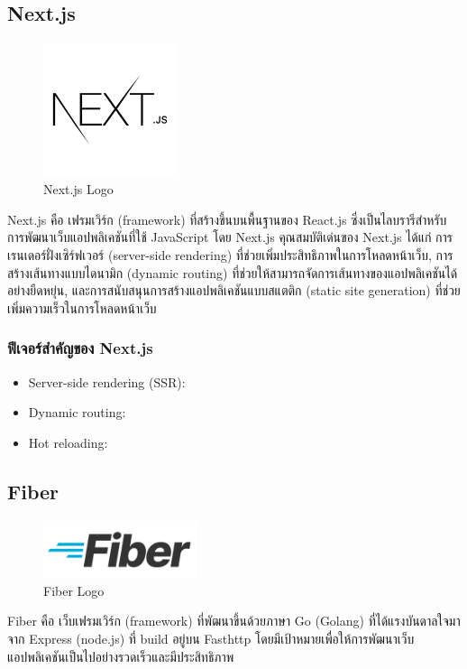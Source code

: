 \subsection{Next.js}
    \begin{figure}[ht]
        \centering
        \includegraphics[width=0.35\textwidth]{image/Tools/nextjs-logo.png}
        \caption[Next.js Logo]{Next.js Logo\footnotemark}
        \label{fig:nextjs_logo}
    \end{figure}
    \FloatBarrier
    \qquad Next.js คือ เฟรมเวิร์ก (framework) ที่สร้างขึ้นบนพื้นฐานของ React.js ซึ่งเป็นไลบรารีสำหรับการพัฒนาเว็บแอปพลิเคชันที่ใช้ JavaScript โดย Next.js คุณสมบัติเด่นของ Next.js ได้แก่ การเรนเดอร์ฝั่งเซิร์ฟเวอร์ (server-side rendering) ที่ช่วยเพิ่มประสิทธิภาพในการโหลดหน้าเว็บ, การสร้างเส้นทางแบบไดนามิก (dynamic routing) ที่ช่วยให้สามารถจัดการเส้นทางของแอปพลิเคชันได้อย่างยืดหยุ่น, และการสนับสนุนการสร้างแอปพลิเคชันแบบสแตติก (static site generation) ที่ช่วยเพิ่มความเร็วในการโหลดหน้าเว็บ
    \subsubsection{ฟีเจอร์สำคัญของ Next.js}
    \begin{itemize}
        \item Server-side rendering (SSR): 
        \item Dynamic routing: 
        \item Hot reloading: 
    \end{itemize}
\subsection{Fiber}
    \begin{figure}[ht]
        \centering
        \includegraphics[width=0.4\textwidth, keepaspectratio]{image/Tools/fiber-logo.png}
        \caption[Fiber Logo]{Fiber Logo\footnotemark}
        \label{fig:fiber_logo}
    \end{figure}
    \FloatBarrier
    \qquad Fiber คือ เว็บเฟรมเวิร์ก (framework) ที่พัฒนาขึ้นด้วยภาษา Go (Golang) ที่ได้แรงบันดาลใจมาจาก Express (node.js) ที่ build อยู่บน Fasthttp โดยมีเป้าหมายเพื่อให้การพัฒนาเว็บแอปพลิเคชันเป็นไปอย่างรวดเร็วและมีประสิทธิภาพ
